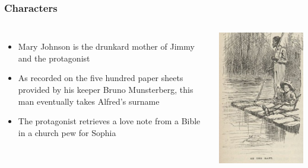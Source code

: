 \documentclass[compress]{beamer}
\begin{document}
\begin{frame}
\frametitle{Characters}

\begin{columns}
  \begin{itemize}


    \item \alert<2>{Mary Johnson} is \alert<2>{the drunkard mother} of \alert<3>{Jimmy} and \alert<4>{the protagonist}

    \item As recorded on the five hundred paper sheets provided by \alert<5>{his} keeper \alert<6>{Bruno Munsterberg}, \alert<5>{this man} eventually takes \alert<7>{Alfred}'s surname

     \item \alert<8>{The protagonist} retrieves a love note from a Bible in a church pew for \alert<9>{Sophia}
       \end{itemize}

  \includegraphics[width=.8\linewidth]{qb/instruction_figures/huck_jim}


\end{columns}

\end{frame}
\end{document}
